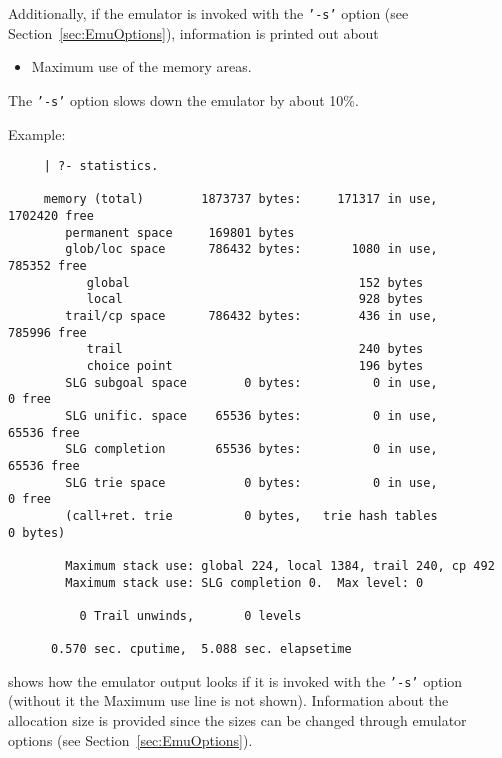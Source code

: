 \begin{description}
    Additionally, if the emulator is invoked with the {\tt '-s'} option
    (see Section~\ref{sec:EmuOptions}), information is printed out about
    \begin{itemize}
    \item Maximum use of the memory areas.
    \end{itemize}
    The {\tt '-s'} option slows down the emulator by about 10\%.

    Example:
    {\footnotesize
     \begin{verbatim}
     | ?- statistics.

     memory (total)        1873737 bytes:     171317 in use,    1702420 free
        permanent space     169801 bytes
        glob/loc space      786432 bytes:       1080 in use,     785352 free
           global                                152 bytes
           local                                 928 bytes
        trail/cp space      786432 bytes:        436 in use,     785996 free
           trail                                 240 bytes
           choice point                          196 bytes
        SLG subgoal space        0 bytes:          0 in use,          0 free
        SLG unific. space    65536 bytes:          0 in use,      65536 free
        SLG completion       65536 bytes:          0 in use,      65536 free
        SLG trie space           0 bytes:          0 in use,          0 free
        (call+ret. trie          0 bytes,   trie hash tables          0 bytes)

        Maximum stack use: global 224, local 1384, trail 240, cp 492
        Maximum stack use: SLG completion 0.  Max level: 0

          0 Trail unwinds,       0 levels

      0.570 sec. cputime,  5.088 sec. elapsetime
     \end{verbatim}}
    shows how the emulator output looks if it is invoked with the 
    {\tt '-s'} option (without it the Maximum use line is not shown).
    Information about the allocation size is provided since the sizes
    can be changed through emulator options
    (see Section~\ref{sec:EmuOptions}).



\end{description}
